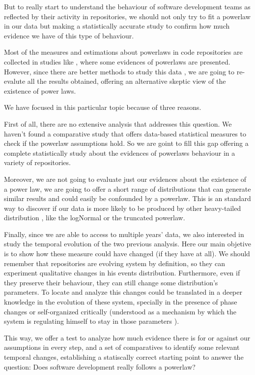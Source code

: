 \documentclass[conference]{IEEEtran}
\begin{document}
But to really start to understand the behaviour of software development teams as
reflected by their activity in repositories, we should not
only try to fit a powerlaw in our data but making a statistically
accurate study to confirm how much evidence we have of this type of
behaviour. 

Most of the measures and estimations about powerlaws in code repositories are collected 
in studies like \cite{merelo2017self}, where some evidences of powerlaws are presented.
However, since there are better methods to study this data \cite{clauset2009power}, 
we are going to re-evalute all the results obtained, offering an alternative skeptic view
of the existence of power laws.

We have focused in this particular topic because of three reasons. 

First of all, there are no 
extensive analysis that addresses this question. We haven't found a comparative study 
that offers data-based statistical measures to check if the powerlaw assumptions hold.
So we are goint to fill this gap offering a complete statistically study about
the evidences of powerlaws behaviour in a variety of repositories.

Moreover, we are not going to evaluate just our evidences about the existence of a power law,
we are going to offer a short range of distributions that can generate similar results and could
easily be confounded by a powerlaw. This is an standard way to discover if our data is more likely
to be produced by other heavy-tailed distribution \cite{clauset2009power}, like the logNormal
or the truncated powerlaw. 

Finally, since we are able to access to multiple years' data, we also interested in study the
temporal evolution of the two previous analysis. Here our main objetive is to show how these measure could 
have changed (if they have at all). We should remember that repositories are evolving system
by definition, so they can experiment qualitative changes in his events distribution. Furthermore, even 
if they preserve their behaviour, they can still change some distribution's parameters.
To locate and analyze this changes could be translated in a deeper knowledge in the evolution 
of these system, specially in the presence of phase changes \cite{merelo2017self} or self-organized
critically (understood as a mechanism by which the system is regulating himself to stay in those 
parameters \cite{newman2005power}).


This way, we offer a test to analyze how much evidence there is for or
against our assumptions in every step, and a set of comparatives to identify some relevant temporal
changes, establishing a statiscally correct starting point to answer the question: Does software
development really follows a powerlaw? 
\end{document}
